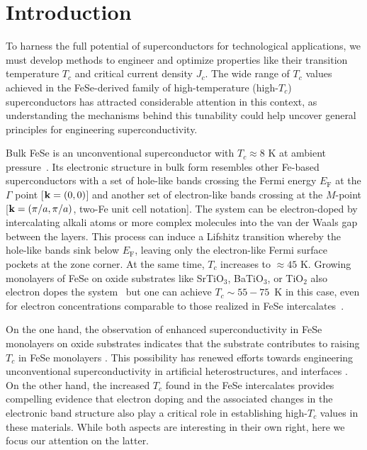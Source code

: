 \documentclass[prb,twocolumn,amsmath,amssymb,superscriptaddress,floatfix,nofootinbib]{revtex4-2}
\begin{document}
\section{Introduction}
To harness the full potential of superconductors for technological applications, we must develop methods to engineer and optimize properties like their transition temperature $T_c$ and critical current density $J_c$. The wide range of $T_c$ values achieved in the FeSe-derived family of high-temperature (high-$T_c$) superconductors \cite{KreiselSymmetry2020, Hsu14262, WangCPL2012, NOJI20148, BurrardLucasNatMat2013, DingPRL2016, Liu2012, He2013, DingNatCommun2013, Ge2015, Shi2017, GuoPRB2010, PhysRevB.80.064506, Medvedev2009, MiyataNatMat2015, SongPRL2016, Krzton_Maziopa_2012, Sun2015} has attracted considerable attention in this context, as understanding the mechanisms behind this tunability could help uncover general principles for engineering superconductivity.   

Bulk FeSe is an unconventional superconductor with $T_c\approx 8$ K at ambient pressure~\cite{Hsu14262}. Its electronic structure in bulk form resembles other Fe-based superconductors with a set of hole-like bands crossing the Fermi energy $E_\mathrm{F}$ at the $\Gamma$ point [${\bf k} = (0,0)$] and another set of electron-like bands crossing at the $M$-point [${\bf k} = (\pi/a,\pi/a)$, two-Fe unit cell notation]. The system can be electron-doped by intercalating alkali atoms \cite{GuoPRB2010, DingNatCommun2013} or more complex molecules \cite{NOJI20148, BurrardLucasNatMat2013, Krzton_Maziopa_2012, Sun2015} into the van der Waals gap between the layers. This process can induce a Lifshitz transition whereby the hole-like bands sink below $E_\mathrm{F}$, leaving only the electron-like Fermi surface pockets at the zone corner. At the same time, $T_c$ increases to $\approx 45$ K. Growing monolayers of FeSe on oxide substrates like SrTiO$_3$, BaTiO$_3$, or TiO$_2$ also electron dopes the system~\cite{Liu2012} but one can achieve $T_c \sim 55-75$~K in this case, even for electron concentrations comparable to those realized in FeSe intercalates~\cite{WangCPL2012, Liu2012, He2013, Ge2015}. 

On the one hand, the observation of enhanced superconductivity in FeSe monolayers on oxide substrates indicates that the substrate contributes to raising $T_c$ in FeSe monolayers \cite{LeeNature2014, Lee2015, Rademaker2016, SongNatureCommun2019, RademakerEnhanced2021}. This possibility has renewed efforts towards engineering unconventional superconductivity in artificial heterostructures, and interfaces \cite{LeeNature2014, CohHeterostructure, PengNatureCommun2014}. On the other hand, the increased $T_c$ found in the FeSe intercalates provides compelling evidence that electron doping and the associated changes in the electronic band structure also play a critical role in establishing high-$T_c$ values in these materials. While both aspects are interesting in their own right, here we focus our attention on the latter. 
\end{document}
